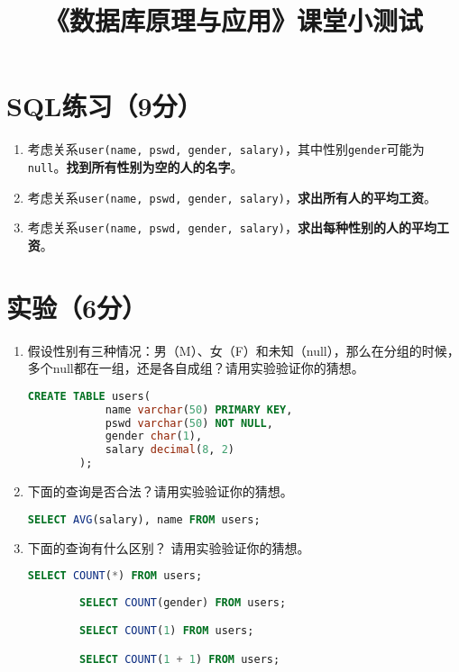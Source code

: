 \documentclass{article}
\title{《数据库原理与应用》课堂小测试}
\begin{document}
\maketitle

\section{SQL练习（9分）}

\begin{enumerate}
    \item 考虑关系\texttt{user(name, pswd, gender, salary)}，其中性别\texttt{gender}可能为\texttt{null}。\textbf{找到所有性别为空的人的名字}。
    \item 考虑关系\texttt{user(name, pswd, gender, salary)}，\textbf{求出所有人的平均工资}。
    \item 考虑关系\texttt{user(name, pswd, gender, salary)}，\textbf{求出每种性别的人的平均工资}。
\end{enumerate}

\section{实验（6分）}
\begin{enumerate}
    \item 假设性别有三种情况：男（M）、女（F）和未知（null），那么在分组的时候，多个null都在一组，还是各自成组？请用实验验证你的猜想。

    \begin{lstlisting}[language=SQL]
        CREATE TABLE users(
            name varchar(50) PRIMARY KEY,
            pswd varchar(50) NOT NULL,
            gender char(1),
            salary decimal(8, 2)
        );
    \end{lstlisting}
    \item 下面的查询是否合法？请用实验验证你的猜想。
    \begin{lstlisting}[language=SQL]
        SELECT AVG(salary), name FROM users;
    \end{lstlisting}  
    \item 下面的查询有什么区别？ 请用实验验证你的猜想。
    \begin{lstlisting}[language=SQL]
        SELECT COUNT(*) FROM users;
        
        SELECT COUNT(gender) FROM users;

        SELECT COUNT(1) FROM users;

        SELECT COUNT(1 + 1) FROM users;
    \end{lstlisting} 
\end{enumerate}
\end{document}
